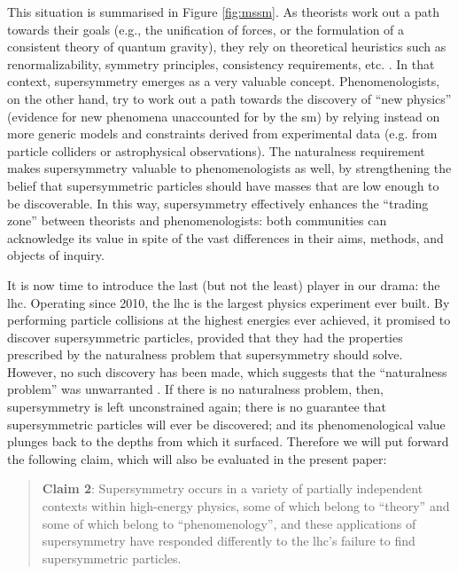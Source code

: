 \documentclass[smallextended]{svjour3}
\begin{document}
This situation is summarised in Figure \ref{fig:mssm}. As theorists work out a path towards their goals (e.g., the unification of forces, or the formulation of a consistent theory of quantum gravity), they rely on theoretical heuristics such as renormalizability, symmetry principles, consistency requirements, etc. \citep{Galison1995}. In that context, supersymmetry emerges as a very valuable concept. Phenomenologists, on the other hand, try to work out a path towards the discovery of ``new physics'' (evidence for new phenomena unaccounted for by the \gls{sm}) by relying instead on more generic models and constraints derived from experimental data (e.g. from particle colliders or astrophysical observations). The naturalness requirement makes supersymmetry valuable to phenomenologists as well, by strengthening the belief that supersymmetric particles should have masses that are low enough to be discoverable. In this way, supersymmetry effectively enhances the ``trading zone'' between theorists and phenomenologists: both communities can acknowledge its value in spite of the vast differences in their aims, methods, and objects of inquiry.%

It is now time to introduce the last (but not the least) player in our drama: the \gls{lhc}. Operating since 2010, the \gls{lhc} is the largest physics experiment ever built. By performing particle collisions at the highest energies ever achieved, it promised to discover supersymmetric particles, provided that they had the properties prescribed by the naturalness problem that supersymmetry should solve. However, no such discovery has been made, which suggests that the ``naturalness problem'' was unwarranted \citep{Giudice2017}. If there is no naturalness problem, then, supersymmetry is left unconstrained again; there is no guarantee that supersymmetric particles will ever be discovered; and its phenomenological value plunges back to the depths from which it surfaced. Therefore we will put forward the following claim, which will also be evaluated in the present paper:

\begin{quote}
    \textbf{Claim 2}: Supersymmetry occurs in a variety of partially independent contexts within high-energy physics, some of which belong to ``theory'' and some of which belong to ``phenomenology'', and these applications of supersymmetry have responded differently to the \gls{lhc}'s failure to find supersymmetric particles.
\end{quote}
\end{document}
